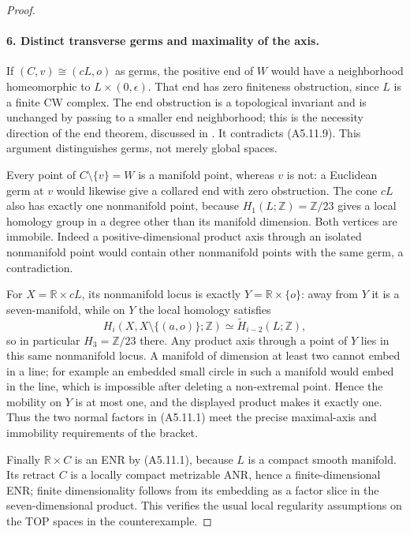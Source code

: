 \begin{proof}
\paragraph{6. Distinct transverse germs and maximality of the axis.}
If $(C,v)\cong(cL,o)$ as germs, the positive end of $W$ would
have a neighborhood homeomorphic to $L\times(0,\epsilon)$.
That end has zero finiteness obstruction, since $L$ is a finite
CW complex.  The end obstruction is a topological invariant and
is unchanged by passing to a smaller end neighborhood; this is
the necessity direction of the end theorem, discussed in
\cite[\S10, Proposition 10.2(i)--(ii), pp.110--111]{A5-HughesRanicki1996}.
It contradicts (A5.11.9).  This argument distinguishes germs,
not merely global spaces.

Every point of $C\setminus\{v\}=W$ is a manifold point, whereas
$v$ is not: a Euclidean germ at $v$ would likewise give a collared
end with zero obstruction.  The cone $cL$ also has exactly one
nonmanifold point, because
$H_1(L;\mathbb Z)=\mathbb Z/23$ gives a local homology group
in a degree other than its manifold dimension.  Both vertices
are immobile.  Indeed a positive-dimensional product axis through
an isolated nonmanifold point would contain other nonmanifold
points with the same germ, a contradiction.

For $X=\mathbb R\times cL$, its nonmanifold locus is exactly
$Y=\mathbb R\times\{o\}$: away from $Y$ it is a seven-manifold,
while on $Y$ the local homology satisfies
\[
 H_i(X,X\setminus\{(a,o)\};\mathbb Z)
             \simeq\widetilde H_{i-2}(L;\mathbb Z),
\]
so in particular $H_3=\mathbb Z/23$ there.  Any product axis
through a point of $Y$ lies in this same nonmanifold locus.
A manifold of dimension at least two cannot embed in a line;
for example an embedded small circle in such a manifold would
embed in the line, which is impossible after deleting a
non-extremal point.  Hence the mobility on $Y$ is at most one,
and the displayed product makes it exactly one.  Thus the two
normal factors in (A5.11.1) meet the precise maximal-axis and
immobility requirements of the bracket.

Finally $\mathbb R\times C$ is an ENR by (A5.11.1), because
$L$ is a compact smooth manifold.  Its retract $C$ is a locally
compact metrizable ANR, hence a finite-dimensional ENR; finite
dimensionality follows from its embedding as a factor slice in
the seven-dimensional product.  This verifies the usual local
regularity assumptions on the TOP spaces in the counterexample.


\end{proof}
